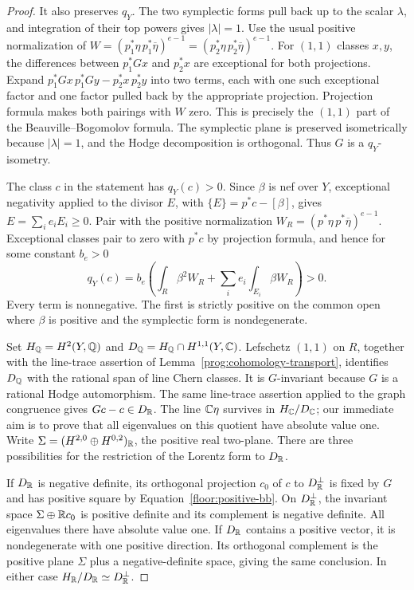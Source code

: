 \begin{proof}
It also preserves \(q_Y\).  The two symplectic forms pull back up to the scalar
\(\lambda\), and integration of their top powers gives \(|\lambda|=1\).
Use the usual positive normalization of
\(W=(p_1^*\eta\,p_1^*\overline\eta)^{e-1}
=(p_2^*\eta\,p_2^*\overline\eta)^{e-1}\).  For \((1,1)\) classes
\(x,y\), the differences between \(p_1^*Gx\) and \(p_2^*x\) are
exceptional for both projections.  Expand
\(p_1^*Gx\,p_1^*Gy-p_2^*x\,p_2^*y\) into two terms, each with one such
exceptional factor and one factor pulled back by the appropriate projection.
Projection formula makes both pairings with \(W\) zero.  This is precisely
the \((1,1)\) part of the Beauville--Bogomolov formula.  The symplectic
plane is preserved isometrically because \(|\lambda|=1\), and the Hodge
decomposition is orthogonal.  Thus \(G\) is a \(q_Y\)-isometry.

The class \(c\) in the statement has \(q_Y(c)>0\). Since \(\beta\)
is nef over \(Y\), exceptional negativity applied to the divisor \(E\),
with \(\{E\}=p^*c-[\beta]\), gives \(E=\sum_i e_iE_i\geq0\). Pair with the positive
normalization \(W_R=(p^*\eta\,p^*\overline\eta)^{e-1}\).  Exceptional
classes pair to zero with \(p^*c\) by projection formula, and hence for
some constant \(b_e>0\)
\begin{equation}\label{floor:positive-bb}
 q_Y(c)=b_e\left(\int_R\beta^2 W_R+\sum_i e_i\int_{E_i}\beta W_R\right)>0.
\end{equation}
Every term is nonnegative.  The first is strictly positive on the common
open where \(\beta\) is positive and the symplectic form is nondegenerate.

Set \(H_\mathbb Q=H^2(Y,\mathbb Q)\) and
\(D_\mathbb Q=H_\mathbb Q\cap H^{1,1}(Y,\mathbb C)\).  Lefschetz \((1,1)\) on \(R\), together
with the line-trace assertion of Lemma~\ref{prog:cohomology-transport},
identifies \(D_\mathbb Q\) with the rational span of line Chern classes.
It is \(G\)-invariant because \(G\) is a rational Hodge automorphism.
The same line-trace assertion applied to the graph congruence gives
\(Gc-c\in D_\mathbb R\).  The line \(\mathbb C\eta\) survives in \(H_\mathbb C/D_\mathbb C\);
our immediate aim is to prove that all eigenvalues on this quotient have
absolute value one.  Write \(\Sigma=(H^{2,0}\oplus H^{0,2})_\mathbb R\), the
positive real two-plane.  There are three possibilities for the restriction
of the Lorentz form to \(D_\mathbb R\).

If \(D_\mathbb R\) is negative definite, its orthogonal projection \(c_0\) of
\(c\) to \(D_\mathbb R^\perp\) is fixed by \(G\) and has positive square by
Equation~\eqref{floor:positive-bb}.  On \(D_\mathbb R^\perp\), the invariant space
\(\Sigma\oplus\mathbb R c_0\) is positive definite and its complement is
negative definite.  All eigenvalues there have absolute value one.  If
\(D_\mathbb R\) contains a positive vector, it is nondegenerate with one
positive direction.  Its orthogonal complement is the positive plane
\(\Sigma\) plus a negative-definite space, giving the same conclusion.
In either case \(H_\mathbb R/D_\mathbb R\simeq D_\mathbb R^\perp\).


\end{proof}
